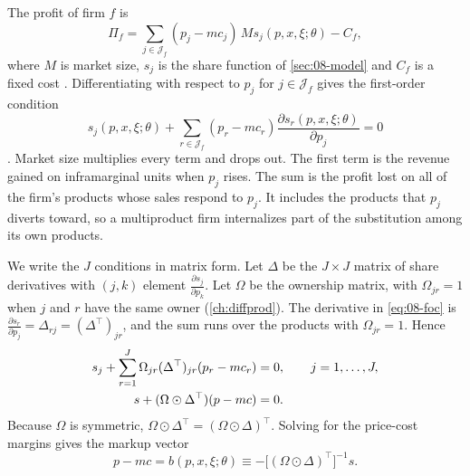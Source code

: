 The profit of firm $f$ is
\begin{equation}\label{eq:08-profit}
  \Pi_f = \sum_{j \in \mathcal{J}_f} (p_j - mc_j)\, M s_j(p, x, \xi; \theta) - C_f ,
\end{equation}
where $M$ is market size, $s_j$ is the share function of \cref{sec:08-model} and $C_f$ is a fixed cost
\citep[eq.~3.2]{BerryLevinsohnPakes1995}. Differentiating with respect to $p_j$ for $j \in \mathcal{J}_f$ gives the
first-order condition
\begin{equation}\label{eq:08-foc}
  s_j(p, x, \xi; \theta) + \sum_{r \in \mathcal{J}_f} (p_r - mc_r)\frac{\partial s_r(p, x, \xi; \theta)}{\partial p_j} = 0
\end{equation}
\citep[eq.~3.3]{BerryLevinsohnPakes1995}. Market size multiplies every term and drops out. The first term is the
revenue gained on inframarginal units when $p_j$ rises. The sum is the profit lost on all of the firm's products whose
sales respond to $p_j$. It includes the products that $p_j$ diverts toward, so a multiproduct firm internalizes part of
the substitution among its own products.

We write the $J$ conditions in matrix form. Let $\Delta$ be the $J \times J$ matrix of share derivatives with
$(j,k)$ element $\frac{\partial s_j}{\partial p_k}$. Let $\Omega$ be the ownership matrix, with $\Omega_{jr} = 1$
when $j$ and $r$ have the same owner (\cref{ch:diffprod}). The derivative in \eqref{eq:08-foc} is
$\frac{\partial s_r}{\partial p_j} = \Delta_{rj} = (\Delta^\top)_{jr}$, and the sum runs over the products with
$\Omega_{jr} = 1$. Hence
\begin{align}
  s_j + \sum_{r=1}^{J} \Omega_{jr}(\Delta^\top)_{jr}(p_r - mc_r) &= 0, \qquad j = 1, \dots, J, \notag\\
  s + (\Omega \odot \Delta^\top)(p - mc) &= 0. \label{eq:08-foc-matrix}
\end{align}
Because $\Omega$ is symmetric, $\Omega \odot \Delta^\top = (\Omega \odot \Delta)^\top$. Solving for the price-cost
margins gives the markup vector
\begin{equation}\label{eq:08-markup}
  p - mc = b(p, x, \xi; \theta) \equiv -\big[(\Omega \odot \Delta)^\top\big]^{-1} s .
\end{equation}

